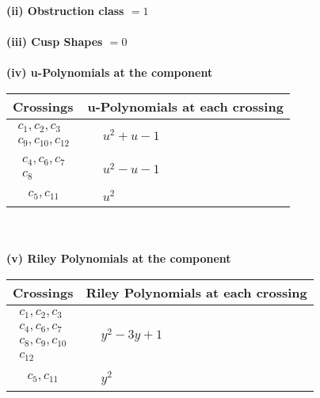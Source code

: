 \documentclass[1p]{elsarticle_modified}
\theoremstyle{definition}
\begin{document}
\flushleft \textbf{(ii) Obstruction class $= 1$}\\~\\
\flushleft \textbf{(iii) Cusp Shapes $= 0$}\\~\\
\newpage\renewcommand{\arraystretch}{1}
\flushleft \textbf{(iv) u-Polynomials at the component}\newline \\
\begin{tabular}{m{50pt}|m{274pt}}
Crossings & \hspace{64pt}u-Polynomials at each crossing \\
\hline $$\begin{aligned}c_{1},c_{2},c_{3}\\c_{9},c_{10},c_{12}\end{aligned}$$&$\begin{aligned}
&u^2+u-1
\end{aligned}$\\
\hline $$\begin{aligned}c_{4},c_{6},c_{7}\\c_{8}\end{aligned}$$&$\begin{aligned}
&u^2- u-1
\end{aligned}$\\
\hline $$\begin{aligned}c_{5},c_{11}\end{aligned}$$&$\begin{aligned}
&u^2
\end{aligned}$\\
\hline
\end{tabular}\\~\\
\newpage\renewcommand{\arraystretch}{1}
\flushleft \textbf{(v) Riley Polynomials at the component}\newline \\
\begin{tabular}{m{50pt}|m{274pt}}
Crossings & \hspace{64pt}Riley Polynomials at each crossing \\
\hline $$\begin{aligned}c_{1},c_{2},c_{3}\\c_{4},c_{6},c_{7}\\c_{8},c_{9},c_{10}\\c_{12}\end{aligned}$$&$\begin{aligned}
&y^2-3 y+1
\end{aligned}$\\
\hline $$\begin{aligned}c_{5},c_{11}\end{aligned}$$&$\begin{aligned}
&y^2
\end{aligned}$\\
\hline
\end{tabular}\\~\\
\end{document}

